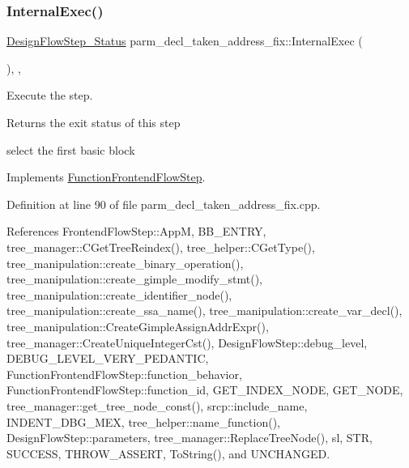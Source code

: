 \subsubsection{\texorpdfstring{Internal\+Exec()}{InternalExec()}}
{\footnotesize\ttfamily \hyperlink{design__flow__step_8hpp_afb1f0d73069c26076b8d31dbc8ebecdf}{Design\+Flow\+Step\+\_\+\+Status} parm\+\_\+decl\+\_\+taken\+\_\+address\+\_\+fix\+::\+Internal\+Exec (\begin{DoxyParamCaption}{ }\end{DoxyParamCaption})\hspace{0.3cm}{\ttfamily [override]}, {\ttfamily [protected]}, {\ttfamily [virtual]}}



Execute the step. 

\begin{DoxyReturn}{Returns}
the exit status of this step 
\end{DoxyReturn}
select the first basic block 

Implements \hyperlink{classFunctionFrontendFlowStep_a00612f7fb9eabbbc8ee7e39d34e5ac68}{Function\+Frontend\+Flow\+Step}.



Definition at line 90 of file parm\+\_\+decl\+\_\+taken\+\_\+address\+\_\+fix.\+cpp.



References Frontend\+Flow\+Step\+::\+AppM, B\+B\+\_\+\+E\+N\+T\+RY, tree\+\_\+manager\+::\+C\+Get\+Tree\+Reindex(), tree\+\_\+helper\+::\+C\+Get\+Type(), tree\+\_\+manipulation\+::create\+\_\+binary\+\_\+operation(), tree\+\_\+manipulation\+::create\+\_\+gimple\+\_\+modify\+\_\+stmt(), tree\+\_\+manipulation\+::create\+\_\+identifier\+\_\+node(), tree\+\_\+manipulation\+::create\+\_\+ssa\+\_\+name(), tree\+\_\+manipulation\+::create\+\_\+var\+\_\+decl(), tree\+\_\+manipulation\+::\+Create\+Gimple\+Assign\+Addr\+Expr(), tree\+\_\+manager\+::\+Create\+Unique\+Integer\+Cst(), Design\+Flow\+Step\+::debug\+\_\+level, D\+E\+B\+U\+G\+\_\+\+L\+E\+V\+E\+L\+\_\+\+V\+E\+R\+Y\+\_\+\+P\+E\+D\+A\+N\+T\+IC, Function\+Frontend\+Flow\+Step\+::function\+\_\+behavior, Function\+Frontend\+Flow\+Step\+::function\+\_\+id, G\+E\+T\+\_\+\+I\+N\+D\+E\+X\+\_\+\+N\+O\+DE, G\+E\+T\+\_\+\+N\+O\+DE, tree\+\_\+manager\+::get\+\_\+tree\+\_\+node\+\_\+const(), srcp\+::include\+\_\+name, I\+N\+D\+E\+N\+T\+\_\+\+D\+B\+G\+\_\+\+M\+EX, tree\+\_\+helper\+::name\+\_\+function(), Design\+Flow\+Step\+::parameters, tree\+\_\+manager\+::\+Replace\+Tree\+Node(), sl, S\+TR, S\+U\+C\+C\+E\+SS, T\+H\+R\+O\+W\+\_\+\+A\+S\+S\+E\+RT, To\+String(), and U\+N\+C\+H\+A\+N\+G\+ED.

